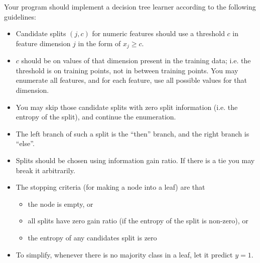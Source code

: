 \documentclass[a4paper]{article}
\theoremstyle{definition}
\begin{document}
Your program should implement a decision tree learner according to the following guidelines:
\begin{itemize}
\item Candidate splits $(j,c)$ for numeric features should use a threshold $c$ in feature dimension $j$ in the form of $x_{j}\ge c$.
\item $c$ should be on values of that dimension present in the training data; i.e. the threshold is on training points, not in between training points. You may enumerate all features, and for each feature, use all possible values for that dimension.
\item You may skip those candidate splits with zero split information (i.e. the entropy of the split), and continue the enumeration.
\item The left branch of such a split is the ``then'' branch, and the right branch is ``else''.
\item Splits should be chosen using information gain ratio. If there is a tie you may break it arbitrarily.
\item The stopping criteria (for making a node into a leaf) are that
	\begin{itemize}
	\item the node is empty, or
	\item all splits have zero gain ratio (if the entropy of the split is non-zero), or
	\item the entropy of any candidates split is zero
	\end{itemize}
\item To simplify, whenever there is no majority class in a leaf, let it predict $y=1$.
\end{itemize}
\end{document}
